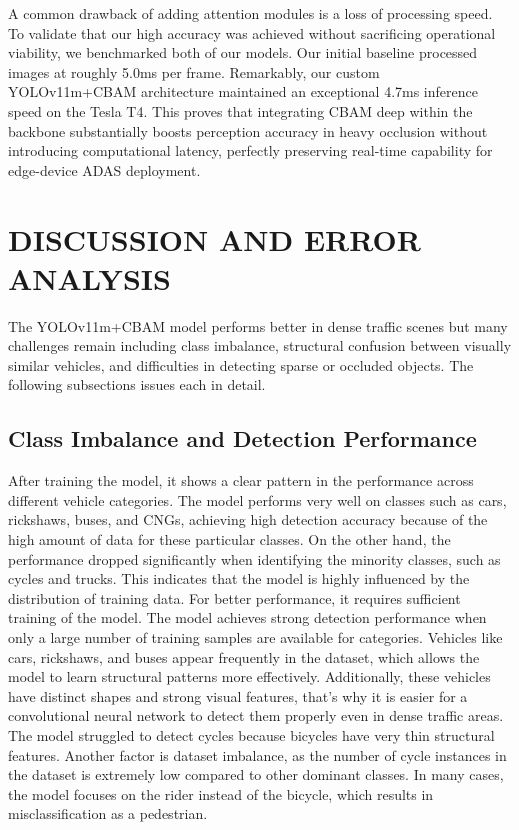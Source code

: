 \documentclass[sigconf]{acmart}
\begin{document}
A common drawback of adding attention modules is a loss of processing speed. To validate that our high accuracy was achieved without sacrificing operational viability, we benchmarked both of our models. Our initial baseline processed images at roughly 5.0ms per frame. Remarkably, our custom YOLOv11m+CBAM architecture maintained an exceptional 4.7ms inference speed on the Tesla T4. This proves that integrating CBAM deep within the backbone substantially boosts perception accuracy in heavy occlusion without introducing computational latency, perfectly preserving real-time capability for edge-device ADAS deployment.

\section{DISCUSSION AND ERROR ANALYSIS}
The YOLOv11m+CBAM model performs better in dense traffic scenes but many challenges remain including class imbalance, structural confusion between visually similar vehicles, and difficulties in detecting sparse or occluded objects. The following subsections issues each in detail.

\subsection{Class Imbalance and Detection Performance}

After training the model, it shows a clear pattern in the performance across different vehicle categories. The model performs very well on classes such as cars, rickshaws, buses, and CNGs, achieving high detection accuracy because of the high amount of data for these particular classes. On the other hand, the performance dropped significantly when identifying the minority classes, such as cycles and trucks. This indicates that the model is highly influenced by the distribution of training data. For better performance, it requires sufficient training of the model. The model achieves strong detection performance when only a large number of training samples are available for categories. Vehicles like cars, rickshaws, and buses appear frequently in the dataset, which allows the model to learn structural patterns more effectively. Additionally, these vehicles have distinct shapes and strong visual features, that's why it is easier for a convolutional neural network to detect them properly even in dense traffic areas. The model struggled to detect cycles because bicycles have very thin structural features. Another factor is dataset imbalance, as the number of cycle instances in the dataset is extremely low compared to other dominant classes. In many cases, the model focuses on the rider instead of the bicycle, which results in misclassification as a pedestrian.
\end{document}
